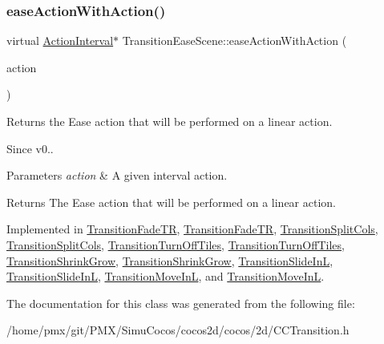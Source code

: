 \mbox{\label{classTransitionEaseScene_a6f27540600b0d703ed30adc8976e65df}} 
\subsubsection{\texorpdfstring{ease\+Action\+With\+Action()}{easeActionWithAction()}\hspace{0.1cm}{\footnotesize\ttfamily [2/2]}}
{\footnotesize\ttfamily virtual \hyperlink{classActionInterval}{Action\+Interval}$\ast$ Transition\+Ease\+Scene\+::ease\+Action\+With\+Action (\begin{DoxyParamCaption}\item[{\hyperlink{classActionInterval}{Action\+Interval} $\ast$}]{action }\end{DoxyParamCaption})\hspace{0.3cm}{\ttfamily [pure virtual]}}

Returns the Ease action that will be performed on a linear action. \begin{DoxySince}{Since}
v0..
\end{DoxySince}

\begin{DoxyParams}{Parameters}
{\em action} & A given interval action. \\
\hline
\end{DoxyParams}
\begin{DoxyReturn}{Returns}
The Ease action that will be performed on a linear action. 
\end{DoxyReturn}


Implemented in \hyperlink{classTransitionFadeTR_a044517e402fd76f102f143c8e00dc852}{Transition\+Fade\+TR}, \hyperlink{classTransitionFadeTR_aa802204cdcae09fa5acacfee75200a11}{Transition\+Fade\+TR}, \hyperlink{classTransitionSplitCols_a4e9f0eafce932c38cb22e5551f487661}{Transition\+Split\+Cols}, \hyperlink{classTransitionSplitCols_a0a9a7b0062cf654a712a17887d4db251}{Transition\+Split\+Cols}, \hyperlink{classTransitionTurnOffTiles_a0aa4b9097d9dce78011713c44e3cd4b8}{Transition\+Turn\+Off\+Tiles}, \hyperlink{classTransitionTurnOffTiles_ab97d4817adc0214335c27b055ef29631}{Transition\+Turn\+Off\+Tiles}, \hyperlink{classTransitionShrinkGrow_af2d5d53552fcfe2f8d61f89f1663444d}{Transition\+Shrink\+Grow}, \hyperlink{classTransitionShrinkGrow_a82ee7adb79f7d88a67a281736f2c19ba}{Transition\+Shrink\+Grow}, \hyperlink{classTransitionSlideInL_a2f3669a542e5cfe1c56a86626f222039}{Transition\+Slide\+InL}, \hyperlink{classTransitionSlideInL_a33aad529498bca2822e6e6f12e78ad4c}{Transition\+Slide\+InL}, \hyperlink{classTransitionMoveInL_a298883652b158cc690f487c011b75255}{Transition\+Move\+InL}, and \hyperlink{classTransitionMoveInL_ab9e3308035155049f79a074ade4de8a1}{Transition\+Move\+InL}.



The documentation for this class was generated from the following file\+:\begin{DoxyCompactItemize}
\item 
/home/pmx/git/\+P\+M\+X/\+Simu\+Cocos/cocos2d/cocos/2d/C\+C\+Transition.\+h\end{DoxyCompactItemize}
